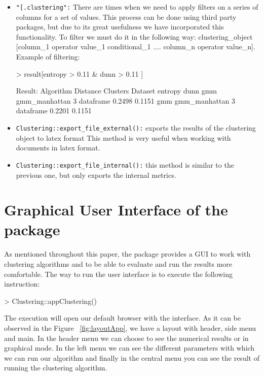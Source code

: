 \begin{itemize}
\begin{Schunk}
\begin{Soutput}
\end{Soutput}
\end{Schunk}
  \item \texttt{"[.clustering":} There are times when we need to apply filters on a series of columns for a set of values. This process can be done using third party packages, but due to its great usefulness we have incorporated this functionality. To filter we must do it in the following way: clustering\_object [column\_1 operator value\_1 conditional\_1 .... column\_n operator value\_n]. Example of filtering:
  \begin{Schunk}
\begin{Sinput}
> result[entropy > 0.11 & dunn > 0.11 ]
\end{Sinput}
\begin{Soutput}
Result:
Algorithm   Distance      Clusters   Dataset    entropy dunn
   gmm     gmm_manhattan      3     dataframe   0.2498 0.1151
   gmm     gmm_manhattan      3     dataframe   0.2201 0.1151
\end{Soutput}
\end{Schunk}
  \item \texttt{Clustering::export\_file\_external():} exports the results of the clustering object to latex format This method is very useful when working with documents in latex format.
  \item \texttt{Clustering::export\_file\_internal():} this method is similar to the previous one, but only exports the internal metrics.
\end{itemize}


\section{Graphical User Interface of the  package}

As mentioned throughout this paper, the  package provides a GUI to work with clustering algorithms and to be able to evaluate and run the results more comfortable. The way to run the user interface is to execute the following instruction:

\begin{Schunk}
\begin{Sinput}
> Clustering::appClustering()
\end{Sinput}
\end{Schunk}

The execution will open our default browser with the interface. As it can be observed in the Figure ~\ref{fig:layoutApp}, we have a layout with header, side menu and main. In the header menu we can choose to see the numerical results or in graphical mode. In the left menu we can see the different parameters with which we can run our algorithm and finally in the central menu you can see the result of running the clustering algorithm.

